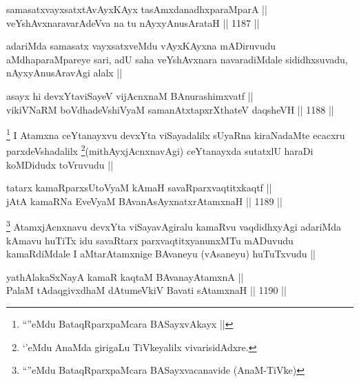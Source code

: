 \begin{shl}
samasatxvayxsatxtAvAyxKAyx tasAmxdanadhxparaMparA || \\
veYshAvxnaravarAdeVva na tu nAyxyAnusArataH ||  1187 ||  
\end{shl}

\begin{artha}
adariMda samasatx vayxsatxveMdu vAyxKAyxna mADiruvudu aMdhaparaMpareye sari, adU saha veYshAvxnara navaradiMdale sididhxsuvadu, nAyxyAnusAravAgi alalx ||
\end{artha}



\begin{shl}
asayx hi devxYtaviSayeV vijAcnxnaM BAnurashimxvatf || \\
vikiVNaRM boVdhadeVshiVyaM samanAtxtapxrXthateV daqsheVH ||  1188 ||  
\end{shl}

\begin{artha}
\footnote{``\stext''eMdu BataqRparxpaMcara BASayxvAkayx ||}
I Atamxna ceYtanayxvu devxYta viSayadalilx sUyaRna kiraNadaMte ecacxru parxdeVshadalilx \footnote{`\stext'eMdu AnaMda girigaLu TiVkeyalilx vivarisidAdxre.}(mithAyxjAcnxnavAgi) ceYtanayxda sutatxlU haraDi koMDidudx toVruvudu ||
\end{artha}

\begin{shl}
tatarx kamaRparxsUtoV\s yaM kAmaH savaRparxvaqtitxkaqtf || \\
jAtA kamaRNa EveVyaM BAvanA\s sAyxnatxrAtamxnaH ||  1189 ||  
\end{shl}

\begin{artha}
\footnote{``\stext''eMdu BataqRparxpaMcara BASayxvacanavide (AnaM-TiVke)}
AtamxjAcnxnavu devxYta viSayavAgiralu kamaRvu vaqdidhxyAgi adariMda kAmavu huTiTx idu savaRtarx parxvaqtitxyanunxMTu mADuvudu kamaRdiMdale I aMtarAtamxnige BAvaneyu (vAsaneyu) huTuTxvudu ||
\end{artha}


\begin{shl}
yathAlakaSxNayA kamaR kaqtaM BAvanayA\s \s tamxnA || \\
PalaM tAdaqgivxdhaM dAtumeVkiV Bavati sA\s \s tamxnaH ||  1190 ||  
\end{shl}

